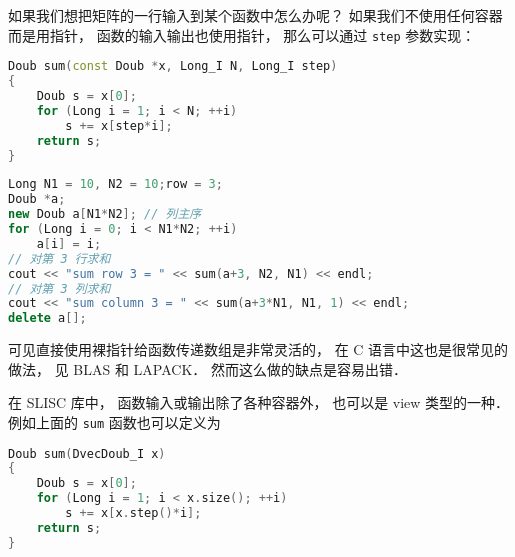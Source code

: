 

如果我们想把矩阵的一行输入到某个函数中怎么办呢？ 如果我们不使用任何容器而是用指针， 函数的输入输出也使用指针， 那么可以通过 \verb|step| 参数实现：
\begin{lstlisting}[language=cpp]
Doub sum(const Doub *x, Long_I N, Long_I step)
{
    Doub s = x[0];
    for (Long i = 1; i < N; ++i)
        s += x[step*i];
    return s;
}
\end{lstlisting}

\begin{lstlisting}[language=cpp]
Long N1 = 10, N2 = 10;row = 3;
Doub *a;
new Doub a[N1*N2]; // 列主序
for (Long i = 0; i < N1*N2; ++i)
    a[i] = i;
// 对第 3 行求和
cout << "sum row 3 = " << sum(a+3, N2, N1) << endl;
// 对第 3 列求和
cout << "sum column 3 = " << sum(a+3*N1, N1, 1) << endl;
delete a[];
\end{lstlisting}

可见直接使用裸指针给函数传递数组是非常灵活的， 在 C 语言中这也是很常见的做法， 见 BLAS 和 LAPACK． 然而这么做的缺点是容易出错．

在 SLISC 库中， 函数输入或输出除了各种容器外， 也可以是 view 类型的一种． 例如上面的 \verb|sum| 函数也可以定义为
\begin{lstlisting}[language=cpp]
Doub sum(DvecDoub_I x)
{
    Doub s = x[0];
    for (Long i = 1; i < x.size(); ++i)
        s += x[x.step()*i];
    return s;
}
\end{lstlisting}
